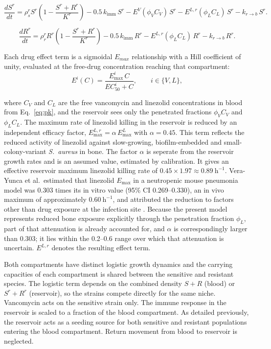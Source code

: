 \documentclass[utf8]{FrontiersinHarvard} %
\begin{document}
\begin{equation}
\frac{dS^r}{dt}
= \rho_{s}^{r} S^{r} \left( 1 - \frac{S^r + R^r}{K^r} \right)
- 0.5\, k_{\text{imm}}\, S^r
- E^{V}(\phi_{V} C_V)\, S^r
- E^{L,r}(\phi_{L} C_L)\, S^r
- k_{r\to b}\, S^r .
\label{eq:dSrdt}
\end{equation}

\begin{equation}
\frac{dR^r}{dt}
= \rho_{r}^{r} R^{r} \left( 1 - \frac{S^r + R^r}{K^r} \right)
- 0.5\, k_{\text{imm}}\, R^r
- E^{L,r}(\phi_{L} C_L)\, R^r
- k_{r\to b}\, R^r .
\label{eq:dRrdt}
\end{equation}

Each drug effect term is a sigmoidal $E_{max}$ relationship with a Hill
coefficient of unity, evaluated at the free-drug concentration reaching
that compartment:
\begin{equation}
E^{i}(C) = \frac{E_{\max}^{i}\, C}{EC_{50}^{i} + C},
\qquad i \in \{V, L\},
\label{eq:hill}
\end{equation}

where $C_V$ and $C_L$ are the free vancomycin and linezolid
concentrations in blood from Eq.~\eqref{eq:pk}, and the reservoir sees
only the penetrated fractions $\phi_V C_V$ and $\phi_L C_L$. The maximum rate of linezolid killing in the
reservoir is reduced by an independent efficacy factor,
$E_{\max}^{L,r} = \alpha\,E_{\max}^{L}$ with $\alpha = 0.45$.   This term reflects the
reduced activity of linezolid against slow-growing, biofilm-embedded and
small-colony-variant \textit{S.~aureus} in bone. The factor $\alpha$ is seperate
from the reservoir growth rates and is an assumed value, estimated by calibration.
It gives an effective reservoir maximum linezolid killing rate of
$0.45 \times 1.97 \approx 0.89~\mathrm{h}^{-1}$. Vera-Yunca et al.\ estimated that linezolid
$E_{\max}$ in a neutropenic mouse pneumonia model was 0.303 times its in vitro value (95\% CI
0.269--0.330), an in vivo maximum of approximately $0.60~\mathrm{h}^{-1}$, and attributed the
reduction to factors other than drug exposure at the infection site \citep{VeraYunca2025}.
Because the present model represents reduced bone exposure explicitly through the penetration
fraction $\phi_L$, part of that attenuation is already accounted for, and $\alpha$ is
correspondingly larger than 0.303; it lies within the 0.2--0.6 range over which that
attenuation is uncertain.
$E^{L,r}$ denotes the resulting effect term.

Both compartments have distinct logistic growth dynamics and the carrying
capacities of each compartment is shared between the sensitive and resistant species.
The logistic term depends on the combined density $S+R$ (blood) or $S^r+R^r$ (reservoir), so the strains compete directly for the same niche.
Vancomycin acts on the sensitive strain only.
The immune response in the reservoir is scaled to a fraction of the
blood compartment. As detailed previously, the reservoir acts as a seeding
source for both sensitive and resistant populations entering the blood
compartment. Return movement from blood to reservoir is neglected.
\end{document}
